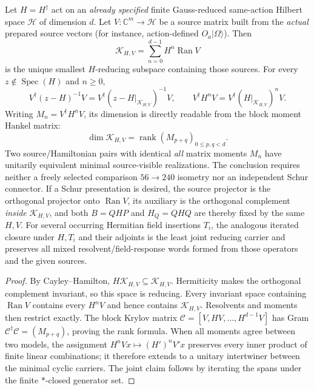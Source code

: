 \documentclass[12pt,a4paper]{article}
\begin{document}
\begin{theorem}
\label{p10:thm:v374-source-cyclic-observable-realization}
Let $H=H^\dagger$ act on an \emph{already specified} finite
Gauss-reduced same-action Hilbert space $\mathcal H$ of dimension $d$.
Let $V:\mathbb C^m\to\mathcal H$ be a source matrix built from the
\emph{actual} prepared source vectors (for instance, action-defined
$O_a|\Omega\rangle$). Then
\[
 \boxed{\mathcal K_{H,V}=\sum_{n=0}^{d-1}H^n\operatorname{Ran}V}
\]
is the unique smallest $H$-reducing subspace containing those sources.
For every $z\notin\operatorname{Spec}(H)$ and $n\ge0$,
\[
 \boxed{V^\dagger(z-H)^{-1}V
 =V^\dagger(z-H|_{\mathcal K_{H,V}})^{-1}V,\qquad
 V^\dagger H^nV=V^\dagger(H|_{\mathcal K_{H,V}})^nV.}
\]
Writing $M_n=V^\dagger H^nV$, its dimension is directly readable
from the block moment Hankel matrix:
\[
 \boxed{\dim\mathcal K_{H,V}
 =\operatorname{rank}(M_{p+q})_{0\le p,q<d}.}
\]
Two source/Hamiltonian pairs with identical \emph{all} matrix moments
$M_n$ have unitarily equivalent minimal source-visible realizations.
The conclusion requires neither a freely selected comparison
$56\to240$ isometry nor an independent Schur connector. If a Schur
presentation is desired, the source projector is the orthogonal
projector onto $\operatorname{Ran}V$, its auxiliary is the orthogonal
complement \emph{inside} $\mathcal K_{H,V}$, and both $B=QHP$ and
$H_Q=QHQ$ are thereby fixed by the same $H,V$.
For several occurring Hermitian field insertions $T_i$, the analogous
iterated closure under $H,T_i$ and their adjoints is the least joint
reducing carrier and preserves all mixed resolvent/field-response
words formed from those operators and the given sources.
\end{theorem}
\begin{proof}
By Cayley--Hamilton, $H\mathcal K_{H,V}\subseteq\mathcal K_{H,V}$.
Hermiticity makes the orthogonal complement invariant, so this space
is reducing. Every invariant space containing $\operatorname{Ran}V$
contains every $H^nV$ and hence contains $\mathcal K_{H,V}$.
Resolvents and moments then restrict exactly. The block Krylov
matrix $\mathscr C=[V,HV,\ldots,H^{d-1}V]$ has Gram
$\mathscr C^\dagger\mathscr C=(M_{p+q})$, proving the rank formula.
When all moments agree between two models, the assignment
$H^nVx\mapsto (H')^nV'x$ preserves every inner product of finite
linear combinations; it therefore extends to a unitary intertwiner
between the minimal cyclic carriers. The joint claim follows by
iterating the spans under the finite $*$-closed generator set.
\end{proof}
\end{document}
